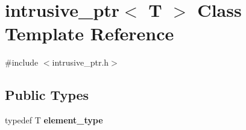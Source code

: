 \hypertarget{classintrusive__ptr}{\section{intrusive\+\_\+ptr$<$ T $>$ Class Template Reference}
\label{classintrusive__ptr}
}


{\ttfamily \#include $<$intrusive\+\_\+ptr.\+h$>$}

\subsection*{Public Types}
\begin{DoxyCompactItemize}
\item 
\hypertarget{classintrusive__ptr_ae15c9aa35038587012d1b08729cc19c9}{typedef T {\bfseries element\+\_\+type}}\label{classintrusive__ptr_ae15c9aa35038587012d1b08729cc19c9}

\end{DoxyCompactItemize}
